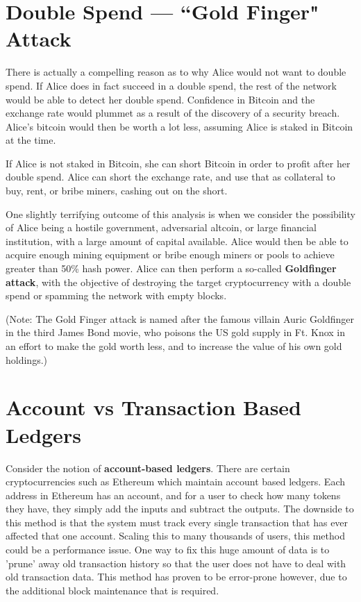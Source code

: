 \documentclass[full.tex]{subfiles}
\begin{document}
    \section*{Double Spend --- ``Gold Finger" Attack}
    
    There is actually a compelling reason as to why Alice would not want to double spend. If Alice does in fact succeed in a double spend, the rest of the network would be able to detect her double spend. Confidence in Bitcoin and the exchange rate would plummet as a result of the discovery of a security breach. Alice's bitcoin would then be worth a lot less, assuming Alice is staked in Bitcoin at the time. 
    
    If Alice is not staked in Bitcoin, she can short Bitcoin in order to profit after her double spend. Alice can short the exchange rate, and use that as collateral to buy, rent, or bribe miners, cashing out on the short.
    
    One slightly terrifying outcome of this analysis is when we consider the possibility of Alice being a hostile government, adversarial altcoin, or large financial institution, with a large amount of capital available. Alice would then be able to acquire enough mining equipment or bribe enough miners or pools to achieve greater than 50\% hash power. Alice can then perform a so-called \textbf{Goldfinger attack}, with the objective of destroying the target cryptocurrency with a double spend or spamming the network with empty blocks.
    
    (Note: The Gold Finger attack is named after the famous villain Auric Goldfinger in the third James Bond movie, who poisons the US gold supply in Ft. Knox in an effort to make the gold worth less, and to increase the value of his own gold holdings.)
    
    \section*{Account vs Transaction Based Ledgers}
    
    Consider the notion of \textbf{account-based ledgers}. There are certain cryptocurrencies such as Ethereum which maintain account based ledgers. Each address in Ethereum has an account, and for a user to check how many tokens they have, they simply add the inputs and subtract the outputs. The downside to this method is that the system must track every single transaction that has ever affected that one account. Scaling this to many thousands of users, this method could be a performance issue. One way to fix this huge amount of data is to 'prune' away old transaction history so that the user does not have to deal with old transaction data. This method has proven to be error-prone however, due to the additional block maintenance that is required. 
    
\end{document}
